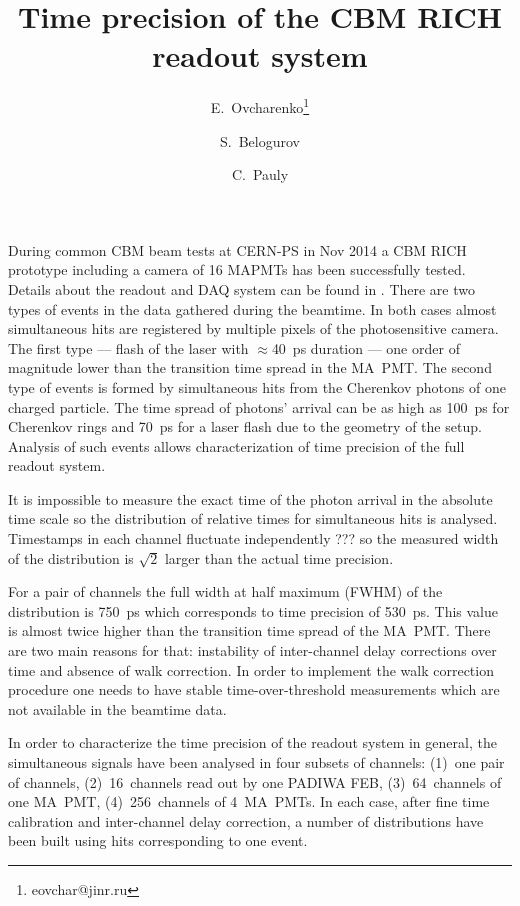 \documentclass{JACoW-GSI-2015}
\begin{document}
\title{Time precision of the CBM RICH readout system}

\author[1]{E.~Ovcharenko\thanks{eovchar@jinr.ru}}
\author[1]{S.~Belogurov}
\author[2]{C.~Pauly}


\maketitle

During common CBM beam tests at CERN-PS in Nov 2014 a CBM RICH prototype including a camera of 16 MAPMTs has been successfully tested. Details about the readout and DAQ system can be found in \cite{RICH2016, PEPANL}. There are two types of events in the data gathered during the beamtime. In both cases almost simultaneous hits are registered by multiple pixels of the photosensitive camera. The first type --- flash of the laser with $\approx$40~ps duration --- one order of magnitude lower than the transition time spread in the MA~PMT. The second type of events is formed by simultaneous hits from the Cherenkov photons of one charged particle. The time spread of photons' arrival can be as high as 100~ps for Cherenkov rings and 70~ps for a laser flash due to the geometry of the setup. Analysis of such events allows characterization of time precision of the full readout system.

It is impossible to measure the exact time of the photon arrival in the absolute time scale so the distribution of relative times for simultaneous hits is analysed. Timestamps in each channel fluctuate independently ??? so the measured width of the distribution is $\sqrt 2$ larger than the actual time precision.

For a pair of channels the full width at half maximum (FWHM) of the distribution is 750~ps which corresponds to time precision of 530~ps. This value is almost twice higher than the transition time spread of the MA~PMT. There are two main reasons for that: instability of inter-channel delay corrections over time and absence of walk correction. In order to implement the walk correction procedure one needs to have stable time-over-threshold measurements which are not available in the beamtime data.

In order to characterize the time precision of the readout system in general, the simultaneous signals have been analysed in four subsets of channels: (1)~one pair of channels, (2)~16~channels read out by one PADIWA FEB, (3)~64~channels of one MA~PMT, (4)~256~channels of 4~MA~PMTs. In each case, after fine time calibration and inter-channel delay correction, a number of distributions have been built using hits corresponding to one event.
\end{document}
